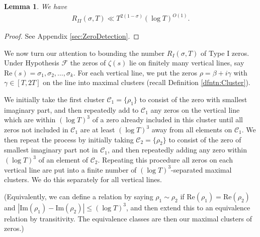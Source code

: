 \documentclass[12pt]{amsart}
\theoremstyle{plain}
\newtheorem{lemma}[theorem]{Lemma}
\theoremstyle{definition}
\theoremstyle{remark}
\begin{document}
%
%
\begin{lemma}\label{lem:TypeIIZeroBound}
We have
\begin{align*}
R_{II}(\sigma,T) \ll T^{2(1-\sigma)}(\log T)^{O(1)}.
\end{align*}
\end{lemma}
%
%
%
%
\begin{proof}
See Appendix \ref{sec:ZeroDetection}.
\end{proof}
%
%
%
%
We now turn our attention to bounding the number $R_I(\sigma,T)$ of Type I zeros. Under Hypothesis $\mathcal{F}$ the zeros of $\zeta(s)$ lie on finitely many vertical lines, say $\text{Re}(s)=\sigma_1,\sigma_2,\dots,\sigma_k$. For each vertical line, we put the zeros $\rho=\beta+i\gamma$ with $\gamma\in[T,2T]$ on the line into maximal clusters (recall Definition \ref{dfntn:Cluster}). 

We initially take the first cluster $\mathcal{C}_1=\{\rho_1\}$ to consist of the zero with smallest imaginary part, and then repeatedly add to $\mathcal{C}_1$ any zeros on the vertical line which are within $(\log{T})^3$ of a zero already included in this cluster until all zeros not included in $\mathcal{C}_1$ are at least $(\log{T})^3$ away from all elements on $\mathcal{C}_1$. We then repeat the process by initially taking $\mathcal{C}_2=\{\rho_2\}$ to consist of the zero of smallest imaginary part not in $\mathcal{C}_1$, and then repeatedly adding any zero within $(\log{T})^3$ of an element of $\mathcal{C}_2$. Repeating this procedure all zeros on each vertical line are put into a finite number of $(\log{T})^3$-separated maximal clusters. We do this separately for all vertical lines. 

(Equivalently, we can define a relation by saying $\rho_1\sim\rho_2$ if $\text{Re}(\rho_1)=\text{Re}(\rho_2)$ and $|\text{Im}(\rho_1)-\text{Im}(\rho_2)|\le (\log{T})^3$, and then extend this to an equivalence relation by transitivity. The equivalence classes are then our maximal clusters of zeros.)
\end{document}
